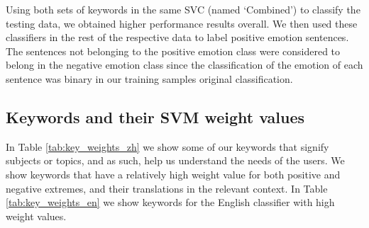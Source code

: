 \documentclass[review]{elsarticle}
\begin{document}
Using both sets of keywords in the same SVC (named ‘Combined’) to classify the testing data, we obtained higher performance results overall. We then used these classifiers in the rest of the respective data to label positive emotion sentences. The sentences not belonging to the positive emotion class were considered to belong in the negative emotion class since the classification of the emotion of each sentence was binary in our training samples original classification.

\subsection{Keywords and their SVM weight values}\label{svmresults}

In Table \ref{tab:key_weights_zh} we show some of our keywords that signify subjects or topics, and as such, help us understand the needs of the users. We show keywords that have a relatively high weight value for both positive and negative extremes, and their translations in the relevant context. In Table \ref{tab:key_weights_en} we show keywords for the English classifier with high weight values.
\end{document}
